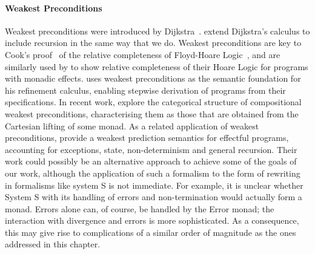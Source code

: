 \paragraph*{Weakest Preconditions}
Weakest preconditions were introduced by Dijkstra~\citep{DBLP:journals/cacm/Dijkstra75}. \citet{DBLP:conf/rex/BonsangueK92} extend Dijkstra's calculus to include recursion in the same way that we do. Weakest preconditions are key to Cook's proof~\citep{DBLP:journals/siamcomp/Cook78} of the relative completeness of Floyd-Hoare Logic~\citep{Floyd1967,DBLP:journals/cacm/Hoare69}, and are similarly used by \citet{DBLP:conf/lics/GoncharovS13} to show relative completeness of their Hoare Logic for programs with monadic effects. \citet{DBLP:books/daglib/0073499} uses weakest preconditions as the semantic foundation for his refinement calculus, enabling stepwise derivation of programs from their specifications. In recent work, \citet{DBLP:journals/mscs/AguirreKK22} explore the categorical structure of compositional weakest preconditions, characterising them as those that are obtained from the Cartesian lifting of some monad.
As a related application of weakest preconditions, \citet{10.1145/3341707} provide a weakest prediction semantics for effectful programs, accounting for exceptions, state, non-determinism and general recursion. Their work could possibly be an alternative approach to achieve some of the goals of our work, although the application of such a formalism to the form of rewriting in formalisms like system S is not immediate. For example, it is unclear whether System S with its handling of errors and non-termination would actually form a monad. Errors alone can, of course, be handled by the Error monad; the interaction with divergence and errors is more sophisticated. As a consequence, this may give rise to complications of a similar order of magnitude as the ones addressed in this chapter.

